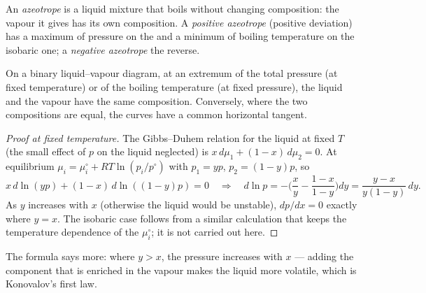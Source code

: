 \begin{definition}[Azeotrope]\label{def:b2:liquid-vapour-diagrams:azeotrope}
An \emph{azeotrope} is a liquid mixture that boils without
changing composition: the vapour it gives has its own composition. A
\emph{positive azeotrope} (positive deviation) has
a maximum of pressure on the  and a minimum of boiling
temperature on the isobaric one; a \emph{negative azeotrope}
the reverse.
\end{definition}

\begin{theorem}\label{thm:b2:liquid-vapour-diagrams:konovalov}
On a binary liquid--vapour diagram, at an extremum of the total pressure (at
fixed temperature) or of the boiling temperature (at fixed pressure), the
liquid and the vapour have the same composition. Conversely, where the
two compositions are equal, the curves have a common horizontal tangent.
\end{theorem}

\begin{proof}[Proof at fixed temperature]
The Gibbs--Duhem relation for the liquid at fixed $T$ (the small effect of $p$
on the liquid neglected) is $x\,d\mu_1 + (1 - x)\,d\mu_2 = 0$. At equilibrium
$\mu_i = \mu_i^\circ + RT\ln(p_i/p^\circ)$ with $p_1 = yp$, $p_2 = (1 - y)p$, so
\[
  x\,d\ln(yp) + (1 - x)\,d\ln((1 - y)p) = 0
  \quad\Longrightarrow\quad
  d\ln p = -\Big(\frac{x}{y} - \frac{1 - x}{1 - y}\Big)dy
  = \frac{y - x}{y(1 - y)}\,dy .
\]
As $y$ increases with $x$ (otherwise the liquid would be unstable),
$dp/dx = 0$ exactly where $y = x$. The isobaric case follows from a similar
calculation that keeps the temperature dependence of the $\mu_i^\circ$; it is
not carried out here.
\end{proof}

The formula says more: where $y > x$, the pressure increases with $x$ ---
adding the component that is enriched in the vapour makes the liquid more
volatile, which is Konovalov's first law.

